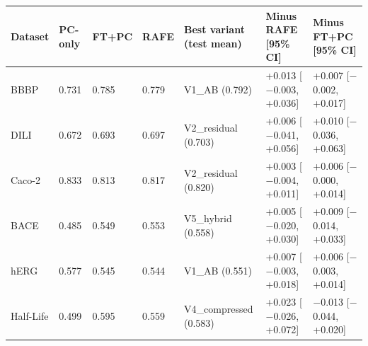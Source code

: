 \begin{tabular}{lllllll}
\toprule
Dataset & PC-only & FT+PC & RAFE & Best variant (test mean) & Minus RAFE [95\% CI] & Minus FT+PC [95\% CI] \\
\midrule
BBBP & 0.731 & 0.785 & 0.779 & V1\_AB (0.792) & +0.013 [$-$0.003, +0.036] & +0.007 [$-$0.002, +0.017] \\
DILI & 0.672 & 0.693 & 0.697 & V2\_residual (0.703) & +0.006 [$-$0.041, +0.056] & +0.010 [$-$0.036, +0.063] \\
Caco-2 & 0.833 & 0.813 & 0.817 & V2\_residual (0.820) & +0.003 [$-$0.004, +0.011] & +0.006 [$-$0.000, +0.014] \\
BACE & 0.485 & 0.549 & 0.553 & V5\_hybrid (0.558) & +0.005 [$-$0.020, +0.030] & +0.009 [$-$0.014, +0.033] \\
hERG & 0.577 & 0.545 & 0.544 & V1\_AB (0.551) & +0.007 [$-$0.003, +0.018] & +0.006 [$-$0.003, +0.014] \\
Half-Life & 0.499 & 0.595 & 0.559 & V4\_compressed (0.583) & +0.023 [$-$0.026, +0.072] & $-$0.013 [$-$0.044, +0.020] \\
\bottomrule
\end{tabular}
